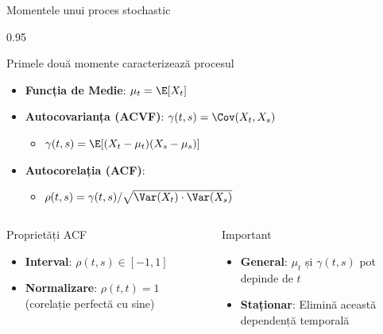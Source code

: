 \documentclass[9pt, aspectratio=169, t]{beamer}
\begin{document}
\begin{frame}{Momentele unui proces stochastic}
    \begin{cminipage}{0.95\textwidth}
        \begin{block}{Primele două momente caracterizează procesul}
            \begin{itemize}\setlength{\itemsep}{0pt}
                \item \textbf{Funcția de Medie}: $\mu_t = \E[X_t]$
                \item \textbf{Autocovarianța (ACVF)}: $\gamma(t, s) = \Cov(X_t, X_s)$
                \begin{itemize}
                    \item $\gamma(t, s) = \E[(X_t - \mu_t)(X_s - \mu_s)]$
                \end{itemize}
                \item \textbf{Autocorelația (ACF)}:
                \begin{itemize}
                    \item $\rho(t, s) = \gamma(t, s) / \sqrt{\Var(X_t) \cdot \Var(X_s)}$
                \end{itemize}
            \end{itemize}
        \end{block}

        \begin{columns}[T]
            \begin{exampleblock}{Proprietăți ACF}
                \begin{itemize}\setlength{\itemsep}{0pt}
                    \item \textbf{Interval}: $\rho(t, s) \in [-1, 1]$
                    \item \textbf{Normalizare}: $\rho(t, t) = 1$ (corelație perfectă cu sine)
                \end{itemize}
            \end{exampleblock}
            \begin{alertblock}{Important}
                \begin{itemize}\setlength{\itemsep}{0pt}
                    \item \textbf{General}: $\mu_t$ și $\gamma(t,s)$ pot depinde de $t$
                    \item \textbf{Staționar}: Elimină această dependență temporală
                \end{itemize}
            \end{alertblock}
        \end{columns}
    \end{cminipage}
\end{frame}
\end{document}
